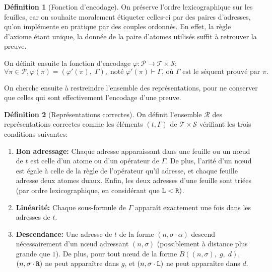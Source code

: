 \documentclass[11pt,a4paper]{article}
\theoremstyle{plain}
\theoremstyle{definition}
\newtheorem{definition}{Définition}
\theoremstyle{remark}
\newcommand*{\someadd}{\sigma}
\newcommand*{\someproof}{\pi}
\newcommand*{\sequent}{\Gamma}
\newcommand*{\Left}{\textnormal{\texttt{L}}}
\newcommand*{\Right}{\textnormal{\texttt{R}}}
\newcommand*{\proofs}{\ensuremath{\mathcal{P}}}
\newcommand*{\sequents}{\ensuremath{\mathcal{S}}}
\newcommand*{\trees}{\ensuremath{\mathcal{T}}}
\newcommand*{\representationslarge}{\ensuremath{\trees \times \sequents}}
\newcommand*{\representations}{\ensuremath{\mathcal{R}}}
\newcommand*{\encode}{\ensuremath{\varphi}}
\begin{document}
\begin{definition}[Fonction d'encodage]
    On préserve l'ordre lexicographique sur les feuilles, car on souhaite moralement étiqueter celles-ci par des paires d'adresses, qu'on implémente en pratique par des couples ordonnés. En effet, la règle d'axiome étant unique, la donnée de la paire d'atomes utilisés suffit à retrouver la preuve.

    On définit ensuite la fonction d'encodage $\encode : \proofs \rightarrow \representationslarge$:
    \begin{equation*}
    \forall \someproof \in \proofs, \encode \left( \someproof \right) = \left( \encode' \left( \someproof \right), \; \sequent \right), \; \text{noté $\encode' \left( \someproof \right) \vdash \sequent$, où $\sequent$ est le séquent prouvé par $\someproof$.}
    \end{equation*}
\end{definition}

On cherche ensuite à restreindre l'ensemble des représentations, pour ne conserver que celles qui sont effectivement l'encodage d'une preuve.

\begin{definition}[Représentations correctes]
    \label{def_rep}
    On définit l'ensemble \representations{} des représentations correctes comme les éléments $(t, \sequent)$ de $\representationslarge$ vérifiant les trois conditions suivantes:
    
    \begin{enumerate}
    \item\label{cadd} \textbf{Bon adressage:} Chaque adresse apparaissant dans une feuille ou un n\oe ud de $t$ est celle d'un atome ou d'un opérateur de $\sequent$. De plus, l'arité d'un n\oe ud est égale à celle de la règle de l'opérateur qu'il adresse, et chaque feuille adresse deux atomes duaux. Enfin, les deux adresses d'une feuille sont triées (par ordre lexicographique, en considérant que $\Left < \Right)$.
    \item\label{clin} \textbf{Linéarité:} Chaque sous-formule de $\sequent$ apparaît exactement une fois dans les adresses de $t$.
    \item\label{cdes} \textbf{Descendance:} Une adresse de $t$ de la forme $(n, \someadd \cdot \alpha)$ descend nécessairement d'un n\oe ud adressant $(n, \someadd)$ (possiblement à distance plus grande que $1$). De plus, pour tout n\oe ud de la forme $B((n, \someadd), \; g, \; d)$, $(n, \someadd \cdot \Right)$ ne peut apparaître dans $g$, et $(n, \someadd \cdot \Left)$ ne peut apparaître dans $d$.
    \end{enumerate}
\end{definition}
\end{document}
